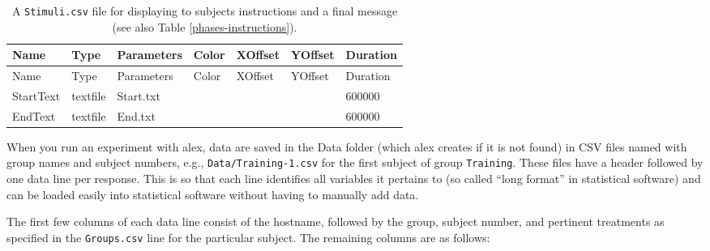 \documentclass[11pt,]{article}
\begin{document}
\begin{longtable}[c]{@{}lllllll@{}}
\caption{A \texttt{Stimuli.csv} file for displaying to subjects
instructions and a final message (see also Table
\ref{phases-instructions}). \label{stimuli-instructions}}\tabularnewline
\toprule
Name & Type & Parameters & Color & XOffset & YOffset &
Duration\tabularnewline
\midrule
\endfirsthead
\toprule
Name & Type & Parameters & Color & XOffset & YOffset &
Duration\tabularnewline
\midrule
\endhead
StartText & textfile & Start.txt & & & & 600000\tabularnewline
EndText & textfile & End.txt & & & & 600000\tabularnewline
\bottomrule
\end{longtable}


When you run an experiment with alex, data are saved in the Data folder
(which alex creates if it is not found) in CSV files named with group
names and subject numbers, e.g., \texttt{Data/Training-1.csv} for the
first subject of group \texttt{Training}. These files have a header
followed by one data line per response. This is so that each line
identifies all variables it pertains to (so called ``long format'' in
statistical software) and can be loaded easily into statistical software
without having to manually add data.

The first few columns of each data line consist of the hostname,
followed by the group, subject number, and pertinent treatments as
specified in the \texttt{Groups.csv} line for the particular subject.
The remaining columns are as follows:
\end{document}
